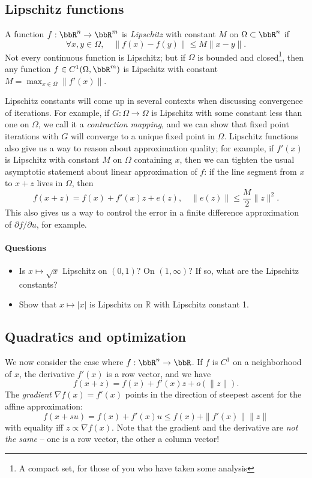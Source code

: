 \documentclass[12pt, leqno]{article} %
\begin{document}
\subsection*{Lipschitz functions}

A function $f : \bbR^n \rightarrow \bbR^m$ is
{\em Lipschitz} with constant $M$ on $\Omega \subset \bbR^n$ if
\[
  \forall x, y \in \Omega, \quad \|f(x)-f(y)\| \leq M\|x-y\|.
\]
Not every continuous function is Lipschitz; but if $\Omega$ is bounded
and closed\footnote{A compact set, for those of you who have taken
  some analysis}, then any function $f \in C^1(\Omega, \bbR^m)$ is
Lipschitz with constant $M = \max_{x \in \Omega} \|f'(x)\|$.

Lipschitz constants will come up in several contexts when
discussing convergence of iterations.  For example,
if $G : \Omega \rightarrow \Omega$ is Lipschitz with some constant
less than one on $\Omega$, we call it a {\em contraction mapping},
and we can show that fixed point iterations with $G$ will converge
to a unique fixed point in $\Omega$.  Lipschitz functions also give
us a way to reason about approximation quality; for example, if
$f'(x)$ is Lipschitz with constant $M$ on $\Omega$ containing $x$, then
we can tighten the usual asymptotic statement about linear
approximation of $f$: if the line segment from $x$ to $x+z$ lives in
$\Omega$, then
\[
  f(x+z) = f(x) + f'(x) z + e(z), \quad \|e(z)\| \leq \frac{M}{2} \|z\|^2.
\]
This also gives us a way to control the error in a finite difference
approximation of $\partial f/\partial u$, for example.

\paragraph*{Questions}

\begin{itemize}
\item Is $x \mapsto \sqrt{x}$ Lipschitz on $(0,1)$?  On $(1,\infty)$?
  If so, what are the Lipschitz constants?
\item Show that $x \mapsto |x|$ is Lipschitz on $\mathbb{R}$ with
  Lipschitz constant 1.
\end{itemize}

\subsection*{Quadratics and optimization}

We now consider the case where $f : \bbR^n \rightarrow \bbR$.
If $f$ is $C^1$ on a neighborhood of $x$, the derivative $f'(x)$
is a row vector, and we have
\[
  f(x+z) = f(x) + f'(x) z + o(\|z\|).
\]
The {\em gradient} $\nabla f(x) = f'(x)$ points in the direction
of steepest ascent for the affine approximation:
\[
  f(x+su) = f(x) + f'(x) u \leq f(x) + \|f'(x)\| \|z\|
\]
with equality iff $z \propto \nabla f(x)$.  Note that the gradient
and the derivative are {\em not the same} -- one is a row vector,
the other a column vector!
\end{document}
